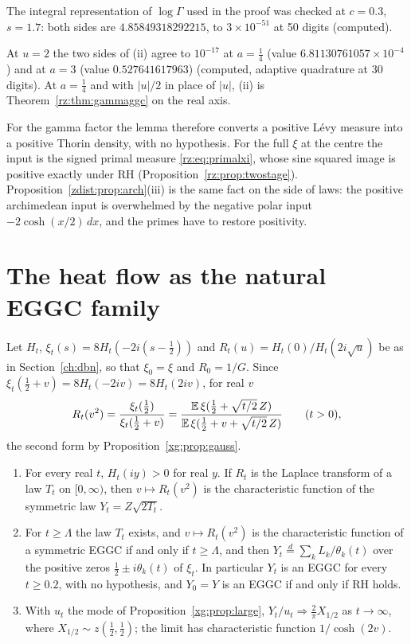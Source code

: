The integral representation of $\log\Gamma$ used in the proof was checked at $c=0.3$, $s=1.7$: both sides are $4.85849318292215$, to $3\times10^{-51}$ at 50 digits (computed).

At $u=2$ the two sides of (ii) agree to $10^{-17}$ at $a=\frac14$ (value $6.81130761057\times10^{-4}$) and at $a=3$ (value $0.527641617963$) (computed, adaptive quadrature at 30 digits). At $a=\frac14$ and with $|u|/2$ in place of $|u|$, (ii) is Theorem~\ref{rz:thm:gammaggc} on the real axis.

For the gamma factor the lemma therefore converts a positive L\'evy measure into a positive Thorin density, with no hypothesis. For the full $\xi$ at the centre the input is the signed primal measure \eqref{rz:eq:primalxi}, whose sine squared image is positive exactly under RH (Proposition~\ref{rz:prop:twostage}). Proposition~\ref{zdist:prop:arch}(iii) is the same fact on the side of laws: the positive archimedean input is overwhelmed by the negative polar input $-2\cosh(x/2)\,dx$, and the primes have to restore positivity.

\section{The heat flow as the natural EGGC family}\label{zdist:sec:flow}

Let $H_t$, $\xi_t(s)=8H_t(-2i(s-\frac12))$ and $R_t(u)=H_t(0)/H_t(2i\sqrt u)$ be as in Section~\ref{ch:dbn}, so that $\xi_0=\xi$ and $R_0=1/G$. Since $\xi_t(\frac12+v)=8H_t(-2iv)=8H_t(2iv)$, for real $v$
\begin{equation}\label{zdist:eq:Rt}
R_t(v^2)=\frac{\xi_t(\frac12)}{\xi_t(\frac12+v)}=\frac{\mathbb{E}\,\xi(\frac12+\sqrt{t/2}\,Z)}{\mathbb{E}\,\xi(\frac12+v+\sqrt{t/2}\,Z)}\qquad(t>0),
\end{equation}
the second form by Proposition~\ref{xg:prop:gauss}.

\begin{theorem}\label{zdist:thm:flow}
\begin{enumerate}
\item[(i)] For every real $t$, $H_t(iy)>0$ for real $y$. If $R_t$ is the Laplace transform of a law $T_t$ on $[0,\infty)$, then $v\mapsto R_t(v^2)$ is the characteristic function of the symmetric law $Y_t=Z\sqrt{2T_t}$.
\item[(ii)] For $t\ge\Lambda$ the law $T_t$ exists, and $v\mapsto R_t(v^2)$ is the characteristic function of a symmetric EGGC if and only if $t\ge\Lambda$, and then $Y_t\stackrel d=\sum_kL_k/\theta_k(t)$ over the positive zeros $\frac12\pm i\theta_k(t)$ of $\xi_t$. In particular $Y_t$ is an EGGC for every $t\ge0.2$, with no hypothesis, and $Y_0=Y$ is an EGGC if and only if RH holds.
\item[(iii)] With $u_t$ the mode of Proposition~\ref{xg:prop:large}, $Y_t/u_t\Rightarrow\frac2\pi X_{1/2}$ as $t\to\infty$, where $X_{1/2}\sim z(\frac12,\frac12)$; the limit has characteristic function $1/\cosh(2v)$.
\end{enumerate}
\end{theorem}

